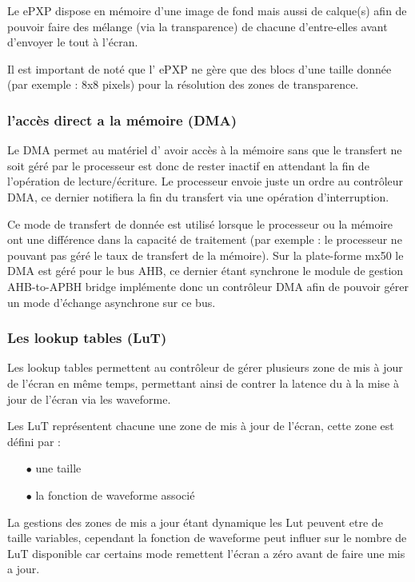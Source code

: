 Le ePXP dispose en mémoire d'une image de fond mais aussi de calque(s) afin de pouvoir faire des 
mélange (via la transparence) de chacune d'entre-elles avant d'envoyer le tout à l'écran.

Il est important de noté que l' ePXP ne gère que des blocs d'une taille donnée (par exemple : 8x8 pixels) pour la résolution des zones de transparence.

\subsubsection{l'accès direct a la mémoire (DMA)}

Le DMA permet au matériel d' avoir accès à la mémoire sans que le transfert ne soit géré par le processeur est donc de rester inactif en attendant la fin de l'opération de lecture/écriture.
Le processeur envoie juste un ordre au contrôleur DMA, ce dernier notifiera la fin du transfert via une opération d'interruption.

Ce mode de transfert de donnée est utilisé lorsque le processeur ou la mémoire ont une différence dans la capacité de traitement (par exemple : le processeur ne pouvant pas géré le taux de transfert de la mémoire).
Sur la plate-forme mx50 le DMA est géré pour le bus AHB, ce dernier étant synchrone le module de gestion AHB-to-APBH bridge implémente donc un contrôleur DMA afin de pouvoir gérer un mode d'échange asynchrone sur ce bus.

\subsubsection{Les lookup tables (LuT)}

Les lookup tables permettent au contrôleur de gérer plusieurs zone de mis à jour de l'écran en même temps, permettant ainsi de contrer la latence du à la mise à jour de l'écran via les waveforme.

Les LuT représentent chacune une zone de mis à jour de l'écran, cette zone est défini par : 
	\begin{itemize}
		\item[$\bullet$] une taille
		\item[$\bullet$] la fonction de waveforme associé
	\end{itemize}
La gestions des zones de mis a jour étant dynamique les Lut peuvent etre de taille variables, cependant la fonction de waveforme peut influer sur le nombre de LuT disponible car certains mode remettent l'écran a zéro avant de faire une mis a jour.


